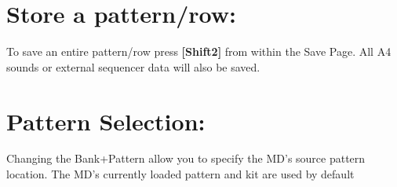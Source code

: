 \section{Store a pattern/row:}
To save an entire pattern/row press \textbf{[Shift2]} from within the Save Page.
All A4 sounds or external sequencer data will also be saved.



\section{Pattern Selection:}

Changing the Bank+Pattern allow you to specify the MD's source pattern location. The MD’s currently loaded pattern and kit are used by default
